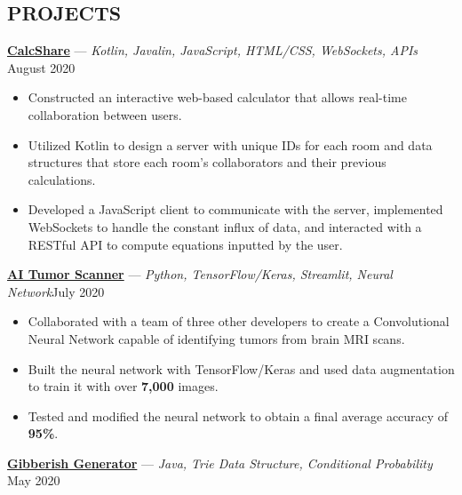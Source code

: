 \documentclass[11pt]{res}
\begin{document}
\begin{footnotesize}
\begin{resume}
\begin{small}
\section{PROJECTS}
\end{small} 
\vspace{.5mm}
\href{https://github.com/CharlesShi12/CalcShare}{\textbf{CalcShare}} — {\sl Kotlin, Javalin, JavaScript, HTML/CSS, WebSockets, APIs} \hfill August 2020\vspace{-4.75mm}
\begin{itemize} \itemsep -2pt 
\item Constructed an interactive web-based calculator that allows real-time collaboration between users. 
\vspace{1mm}
\item Utilized Kotlin to design a server with unique IDs for each room and data structures that store each room's collaborators and their previous calculations.
\vspace{1mm}
\item Developed a JavaScript client to communicate with the server, implemented WebSockets to handle the constant influx of data, and interacted with a RESTful API to compute equations inputted by the user.  
\end{itemize}
\vspace{-2.5mm}
\href{https://github.com/CharlesShi12/AI_Tumor_Scanner}{\textbf{AI Tumor Scanner}} — {\sl Python, TensorFlow/Keras, Streamlit, Neural Network}\hfill July 2020\vspace{-4.75mm}
\begin{itemize} \itemsep -2pt 
\item Collaborated with a team of three other developers to create a Convolutional Neural Network capable of identifying tumors from brain MRI scans. 
\vspace{1mm}
\item Built the neural network with TensorFlow/Keras and used data augmentation to train it with over \textbf{7,000} images.
\vspace{1mm}
\item Tested and modified the neural network to obtain a final average accuracy of \textbf{95\%}.
\end{itemize}
\vspace{-2.5mm}
\href{https://github.com/CharlesShi12/GibberishGenerator}{\textbf{Gibberish Generator}} — {\sl Java, Trie Data Structure, Conditional Probability} \hfill May 2020\vspace{-4.75mm}
\begin{itemize} \itemsep -2pt 

\end{itemize}
\end{resume}
\end{footnotesize}
\end{document}
